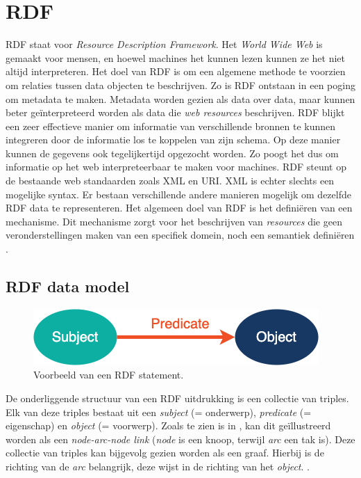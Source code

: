\section{RDF}
\label{sec:rdf}

RDF staat voor \textit{Resource Description Framework}. Het \textit{World Wide Web} is gemaakt voor mensen, en hoewel machines het kunnen lezen kunnen ze het niet altijd interpreteren. Het doel van RDF is om een algemene methode te voorzien om relaties tussen data objecten te beschrijven. Zo is RDF ontstaan in een poging om metadata te maken. Metadata worden gezien als data over data, maar kunnen beter geïnterpreteerd worden als data die \textit{web resources} beschrijven. RDF blijkt een zeer effectieve manier om informatie van verschillende bronnen te kunnen integreren door de informatie los te koppelen van zijn schema. Op deze manier kunnen de gegevens ook tegelijkertijd opgezocht worden. Zo poogt het dus om informatie op het web interpreteerbaar te maken voor machines. RDF steunt op de bestaande web standaarden zoals XML en URI. XML is echter slechts een mogelijke syntax. Er bestaan verschillende andere manieren mogelijk om dezelfde RDF data te representeren. Het algemeen doel van RDF is het definiëren van een mechanisme. Dit mechanisme zorgt voor het beschrijven van \textit{resources} die geen veronderstellingen maken van een specifiek domein, noch een semantiek definiëren \cite{lassila1998resource}.

\subsection{RDF data model}
\begin{figure}
    \centering
    \includegraphics[width=0.5\linewidth]{images/spo.png}
    \caption{Voorbeeld van een RDF statement.}
    \label{fig:spo}
\end{figure}

De onderliggende structuur van een RDF uitdrukking is een collectie van triples. Elk van deze triples bestaat uit een \textit{subject} (= onderwerp), \textit{predicate} (= eigenschap) en \textit{object} (= voorwerp). Zoals te zien is in , kan dit geïllustreerd worden als een \textit{node-arc-node link} (\textit{node} is een knoop, terwijl \textit{arc} een tak is). Deze collectie van triples kan bijgevolg gezien worden als een graaf. Hierbij is de richting van de \textit{arc} belangrijk, deze wijst in de richting van het \textit{object}. \cite{klyne2009resource}.

